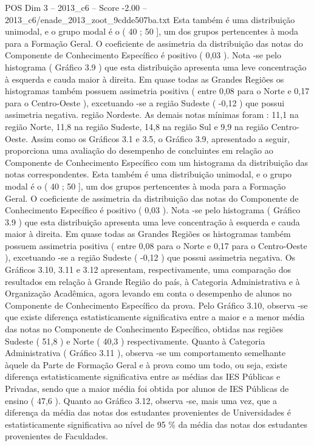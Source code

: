 \begin{textsample}{POS Dim 3 – 2013\_c6 – Score -2.00 – 2013\_c6/enade\_2013\_zoot\_9cdde507ba.txt}
Esta também é uma distribuição unimodal, e o grupo modal é o ( 40 ; 50 ], um dos grupos pertencentes à moda para a Formação Geral.
O coeficiente de assimetria da distribuição das notas do Componente de Conhecimento Específico é positivo ( 0,03 ).
Nota -se pelo histograma ( Gráfico 3.9 ) que esta distribuição apresenta uma leve concentração à esquerda e cauda maior à direita.
Em quase todas as Grandes Regiões os histogramas também possuem assimetria positiva ( entre 0,08 para o Norte e 0,17 para o Centro-Oeste ), excetuando -se a região Sudeste ( -0,12 ) que possui assimetria negativa. região Nordeste.
As demais notas mínimas foram : 11,1 na região Norte, 11,8 na região Sudeste, 14,8 na região Sul e 9,9 na região Centro-Oeste.
Assim como os Gráficos 3.1 e 3.5, o Gráfico 3.9, apresentado a seguir, proporciona uma avaliação do desempenho de concluintes em relação ao Componente de Conhecimento Específico com um histograma da distribuição das notas correspondentes.
Esta também é uma distribuição unimodal, e o grupo modal é o ( 40 ; 50 ], um dos grupos pertencentes à moda para a Formação Geral.
O coeficiente de assimetria da distribuição das notas do Componente de Conhecimento Específico é positivo ( 0,03 ).
Nota -se pelo histograma ( Gráfico 3.9 ) que esta distribuição apresenta uma leve concentração à esquerda e cauda maior à direita.
Em quase todas as Grandes Regiões os histogramas também possuem assimetria positiva ( entre 0,08 para o Norte e 0,17 para o Centro-Oeste ), excetuando -se a região Sudeste ( -0,12 ) que possui assimetria negativa.
Os Gráficos 3.10, 3.11 e 3.12 apresentam, respectivamente, uma comparação dos resultados em relação à Grande Região do país, à Categoria Administrativa e à Organização Acadêmica, agora levando em conta o desempenho de alunos no Componente de Conhecimento Específico da prova.
Pelo Gráfico 3.10, observa -se que existe diferença estatisticamente significativa entre a maior e a menor média das notas no Componente de Conhecimento Específico, obtidas nas regiões Sudeste ( 51,8 ) e Norte ( 40,3 ) respectivamente.
Quanto à Categoria Administrativa ( Gráfico 3.11 ), observa -se um comportamento semelhante àquele da Parte de Formação Geral e à prova como um todo, ou seja, existe diferença estatisticamente significativa entre as médias das IES Públicas e Privadas, sendo que a maior média foi obtida por alunos de IES Públicas de ensino ( 47,6 ).
Quanto ao Gráfico 3.12, observa -se, mais uma vez, que a diferença da média das notas dos estudantes provenientes de Universidades é estatisticamente significativa ao nível de 95 \% da média das notas dos estudantes provenientes de Faculdades.

\end{textsample}
